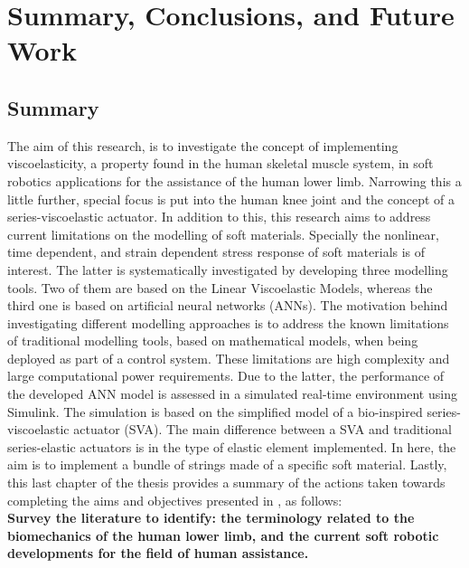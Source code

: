 \chapter{Summary, Conclusions, and Future Work}

\section{Summary}

The aim of this research, is to investigate the concept of implementing viscoelasticity, a property found in the human skeletal muscle system, in soft robotics applications for the assistance of the human lower limb. Narrowing this a little further, special focus is put into the human knee joint and the concept of a series-viscoelastic actuator. In addition to this, this research aims to address current limitations on the modelling of soft materials. Specially the nonlinear, time dependent, and strain dependent stress response of soft materials is of interest. The latter is systematically investigated by developing three modelling tools. Two of them are based on the Linear Viscoelastic Models, whereas the third one is based on artificial neural networks (ANNs). The motivation behind investigating different modelling approaches is to address the known limitations of traditional modelling tools, based on mathematical models, when being deployed as part of a control system. These limitations are high complexity and large computational power requirements. Due to the latter, the performance of the developed ANN model is assessed in a simulated real-time environment using Simulink. The simulation is based on the simplified model of a bio-inspired series-viscoelastic actuator (SVA). The main difference between a SVA and traditional series-elastic actuators is in the type of elastic element implemented. In here, the aim is to implement a bundle of strings made of a specific soft material. Lastly, this last chapter of the thesis provides a summary of the actions taken towards completing the aims and objectives presented in , as follows: 
\\[1em]
\noindent \textbf{ \large{ Survey the literature to identify: the terminology related to the biomechanics of the human lower limb, and the current soft robotic developments for the field of human assistance.}}


